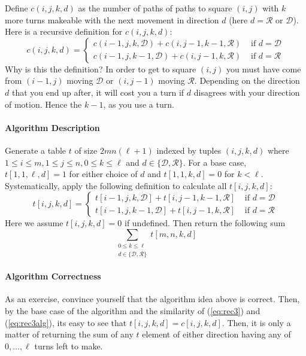 \documentclass[10pt]{article}
\theoremstyle{plain}
\theoremstyle{definition}
\numberwithin{equation}{section}
\numberwithin{figure}{section}
\begin{document}
\noindent Define $c(i, j, k, d)$ as the number of paths of paths to square $(i,j)$  with $k$ more turns makeable with the next movement in direction $d$ (here $d = \mathcal{R}$ or $\mathcal{D}$). Here is a recursive definition for $c(i, j, k, d)$:
\begin{equation}
c(i,j,k, d) = \begin{cases} c(i-1, j, k, \mathcal{D}) + c(i, j-1, k - 1, \mathcal{R}) & \text{ if } d = \mathcal{D} \\
c(i-1, j, k-1, \mathcal{D}) + c(i, j-1,k, \mathcal{R}) & \text{ if } d = \mathcal{R}  \end{cases} \label{eq:rec3}
\end{equation}
Why is this the definition? In order to get to square $(i,j)$ you must have come from $(i - 1, j)$ moving $\mathcal{D}$ or $(i, j - 1)$ moving $\mathcal{R}$. Depending on the direction $d$ that you end up after, it will cost you a turn if $d$ disagrees with your direction of motion. Hence the $k-1$, as you use a turn.

\paragraph{Algorithm Description} Generate a table $t$ of size $2mn(\ell +1)$ indexed by tuples $(i, j, k, d)$ where $1 \leq i \leq m, 1 \leq j \leq n, 0 \leq k \leq \ell$ and $d \in \{ \mathcal{D}, \mathcal{R} \}$. For a base case, $t[1, 1, \ell, d] = 1$ for either choice of $d$ and $t[1,1,k, d] = 0$ for $k < \ell$. Systematically, apply the following definition to calculate all $t[i,j,k,d]$:
\begin{equation}
t[i,j,k,d] = \begin{cases} t[i-1, j, k, \mathcal{D}] + t[i, j-1, k - 1, \mathcal{R}] & \text{ if } d = \mathcal{D} \\
t[i-1, j, k-1, \mathcal{D}] + t[i, j-1,k, \mathcal{R}] & \text{ if } d = \mathcal{R}  \end{cases} \label{eq:rec3alg}
\end{equation}
Here we assume $t[i,j,k,d] = 0$ if undefined. Then return the following sum
\begin{equation}
\sum_{\substack{0 \leq k \leq \ell \\ d \in \{\mathcal{D},\mathcal{R}\}}} t[m,n,k,d]
\end{equation}

\paragraph{Algorithm Correctness} As an exercise, convince yourself that the algorithm idea above is correct. Then, by the base case of the algorithm and the similarity of (\ref{eq:rec3}) and (\ref{eq:rec3alg}), its easy to see that $t[i,j,k,d] = c[i,j,k,d]$. Then, it is only a matter of returning the sum of any $t$ element of either direction having any of $0, \ldots, \ell$ turns left to make.
\end{document}
